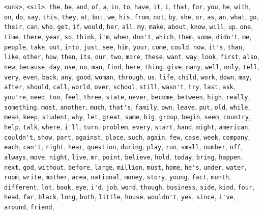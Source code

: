 \verb|<unk>|, \verb|<sil>|, \verb|the|, \verb|be|, \verb|and|, \verb|of|, \verb|a|, \verb|in|, \verb|to|, \verb|have|, \verb|it|, \verb|i|, \verb|that|, \verb|for|, \verb|you|, \verb|he|, \verb|with|, \verb|on|, \verb|do|, \verb|say|, \verb|this|, \verb|they|, \verb|at|, \verb|but|, \verb|we|, \verb|his|, \verb|from|, \verb|not|, \verb|by|, \verb|she|, \verb|or|, \verb|as|, \verb|an|, \verb|what|, \verb|go|, \verb|their|, \verb|can|, \verb|who|, \verb|get|, \verb|if|, \verb|would|, \verb|her|, \verb|all|, \verb|my|, \verb|make|, \verb|about|, \verb|know|, \verb|will|, \verb|up|, \verb|one|, \verb|time|, \verb|there|, \verb|year|, \verb|so|, \verb|think|, \verb|i'm|, \verb|when|, \verb|don't|, \verb|which|, \verb|them|, \verb|some|, \verb|didn't|, \verb|me|, \verb|people|, \verb|take|, \verb|out|, \verb|into|, \verb|just|, \verb|see|, \verb|him|, \verb|your|, \verb|come|, \verb|could|, \verb|now|, \verb|it's|, \verb|than|, \verb|like|, \verb|other|, \verb|how|, \verb|then|, \verb|its|, \verb|our|, \verb|two|, \verb|more|, \verb|these|, \verb|want|, \verb|way|, \verb|look|, \verb|first|, \verb|also|, \verb|new|, \verb|because|, \verb|day|, \verb|use|, \verb|no|, \verb|man|, \verb|find|, \verb|here|, \verb|thing|, \verb|give|, \verb|many|, \verb|well|, \verb|only|, \verb|tell|, \verb|very|, \verb|even|, \verb|back|, \verb|any|, \verb|good|, \verb|woman|, \verb|through|, \verb|us|, \verb|life|, \verb|child|, \verb|work|, \verb|down|, \verb|may|, \verb|after|, \verb|should|, \verb|call|, \verb|world|, \verb|over|, \verb|school|, \verb|still|, \verb|wasn't|, \verb|try|, \verb|last|, \verb|ask|, \verb|you're|, \verb|need|, \verb|too|, \verb|feel|, \verb|three|, \verb|state|, \verb|never|, \verb|become|, \verb|between|, \verb|high|, \verb|really|, \verb|something|, \verb|most|, \verb|another|, \verb|much|, \verb|that's|, \verb|family|, \verb|own|, \verb|leave|, \verb|put|, \verb|old|, \verb|while|, \verb|mean|, \verb|keep|, \verb|student|, \verb|why|, \verb|let|, \verb|great|, \verb|same|, \verb|big|, \verb|group|, \verb|begin|, \verb|seem|, \verb|country|, \verb|help|, \verb|talk|, \verb|where|, \verb|i'll|, \verb|turn|, \verb|problem|, \verb|every|, \verb|start|, \verb|hand|, \verb|might|, \verb|american|, \verb|couldn't|, \verb|show|, \verb|part|, \verb|against|, \verb|place|, \verb|such|, \verb|again|, \verb|few|, \verb|case|, \verb|week|, \verb|company|, \verb|each|, \verb|can't|, \verb|right|, \verb|hear|, \verb|question|, \verb|during|, \verb|play|, \verb|run|, \verb|small|, \verb|number|, \verb|off|, \verb|always|, \verb|move|, \verb|night|, \verb|live|, \verb|mr|, \verb|point|, \verb|believe|, \verb|hold|, \verb|today|, \verb|bring|, \verb|happen|, \verb|next|, \verb|god|, \verb|without|, \verb|before|, \verb|large|, \verb|million|, \verb|must|, \verb|home|, \verb|he's|, \verb|under|, \verb|water|, \verb|room|, \verb|write|, \verb|mother|, \verb|area|, \verb|national|, \verb|money|, \verb|story|, \verb|young|, \verb|fact|, \verb|month|, \verb|different|, \verb|lot|, \verb|book|, \verb|eye|, \verb|i'd|, \verb|job|, \verb|word|, \verb|though|, \verb|business|, \verb|side|, \verb|kind|, \verb|four|, \verb|head|, \verb|far|, \verb|black|, \verb|long|, \verb|both|, \verb|little|, \verb|house|, \verb|wouldn't|, \verb|yes|, \verb|since|, \verb|i've|, \verb|around|, \verb|friend|, 